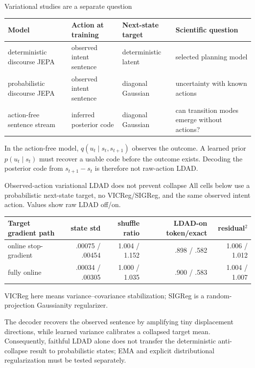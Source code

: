 \documentclass[aspectratio=169,10pt]{beamer}
\begin{document}
\begin{frame}{Variational studies are a separate question}
\small
\begin{tabular}{p{}p{}p{}p{}}
\toprule
Model & Action at training & Next-state target & Scientific question\\
\midrule
deterministic discourse JEPA & observed intent sentence & deterministic latent & selected planning model\\
probabilistic discourse JEPA & observed intent sentence & diagonal Gaussian & uncertainty with known actions\\
action-free sentence stream & inferred posterior code & diagonal Gaussian & can transition modes emerge without actions?\\
\bottomrule
\end{tabular}

\medskip
In the action-free model, $q(u_t\mid s_t,s_{t+1})$ observes the outcome. A
learned prior $p(u_t\mid s_t)$ must recover a usable code before the outcome
exists. Decoding the posterior code from $s_{t+1}-s_t$ is therefore not
raw-action LDAD.
\end{frame}

\begin{frame}{Observed-action variational LDAD does not prevent collapse}
\small
All cells below use a probabilistic next-state target, no VICReg/SIGReg, and
the same observed intent action. Values show raw LDAD off/on.

\medskip
\centering
\begin{tabular}{lrrrr}
\toprule
Target gradient path & state std & shuffle ratio & LDAD-on token/exact & residual$^2$\\
\midrule
online stop-gradient & .00075 / .00454 & 1.004 / 1.152 & .898 / .582 & 1.006 / 1.012\\
fully online & .00034 / .00305 & 1.000 / 1.035 & .900 / .583 & 1.004 / 1.007\\
\bottomrule
\end{tabular}

\medskip
\scriptsize VICReg here means variance--covariance stabilization; SIGReg is a
random-projection Gaussianity regularizer.\par
\smallskip
\raggedright
The decoder recovers the observed sentence by amplifying tiny displacement
directions, while learned variance calibrates a collapsed target mean.
Consequently, faithful LDAD alone does not transfer the deterministic
anti-collapse result to probabilistic states; EMA and explicit distributional
regularization must be tested separately.
\end{frame}
\end{document}
